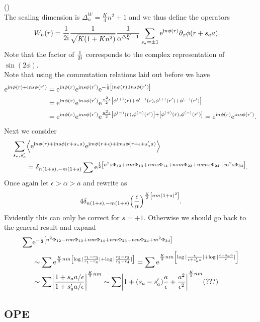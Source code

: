 \documentclass[english, parskip=full]{scrartcl}
\begin{document}
()\\
The scaling dimension is $\Delta^W_n = \frac{K}{4}n^2+1$ and we thus define the operators
\begin{align}
W_n(r) &= \frac{1}{2\i} \frac{1}{\sqrt{K \kla*{1 + Kn^2}}} \frac{1}{\alpha^{\Delta^W_n-1}} \sum_{s_a=\pm 1} \powe{\i n\phi(r)} \partial_x\phi(r+s_aa).
\end{align}
Note that the factor of $\frac{1}{2\i}$ corresponds to the complex representation of $\sin(2\phi)$.\\
Note that using the commutation relations laid out before we have
\begin{align}
\powe{\i n\phi(r) + \i ns\phi(r')} &= \powe{\i n\phi(r)}\powe{\i ns\phi(r')} \powe{-\frac{1}{2} \klb*{\i n\phi(r), \i ns\phi(r')}} \\
&= \powe{\i n\phi(r)}\powe{\i ns\phi(r')} \powe{\frac{n^2s}{2} \klb*{\phi^{(+)}(r) + \phi^{(-)}(r), \phi^{(+)}(r') + \phi^{(-)}(r')}}\\
&= \powe{\i n\phi(r)}\powe{\i ns\phi(r')} \powe{\frac{n^2s}{2} \klb*{\phi^{(-)}(r), \phi^{(+)}(r')} + \klb*{\phi^{(+)}(r), \phi^{(-)}(r')}} = \powe{\i n\phi(r)}\powe{\i ns\phi(r')}.
\end{align}
Next we consider 
\begin{align}
\sum_{s_a,s_a'}& \bra*{\powe{\i n\phi(r) + \i n s\phi(r+s_aa)}\powe{\i m\phi(r+\epsilon) + \i m s \phi(r+\epsilon+s_a'a)}}\\
&= \delta_{n(1+s),-m(1+s)} \sum \powe{\frac{1}{2} \klb*{n^2s\Phi_{12} + nm\Phi_{13} + nms \Phi_{14} + nsm\Phi_{23} + nsms\Phi_{24} + m^2s\Phi_{34}}}.
\end{align}
Once again let $\epsilon>\alpha>a$ and rewrite as
\begin{align}
4\delta_{n(1+s),-m(1+s)} \kla*{\frac{\epsilon}{\alpha}}^{\frac{K}{2}\klb*{nm(1+s)^2}}.
\end{align}
Evidently this can only be correct for $s=+1$.
Otherwise we should go back to the general result and expand
\begin{align}
\sum &\powe{-\frac{1}{2} \klb*{n^2\Phi_{12} - nm\Phi_{13} + nm \Phi_{14} + nm\Phi_{23} - nm\Phi_{24} + m^2\Phi_{34}}}\\
&\sim \sum \powe{\frac{K}{2}nm \klb*{\log|\frac{r_1-r_3}{r_1-r_4}| + \log|\frac{r_2-r_3}{r_2-r_4}|}} = \sum \powe{\frac{K}{2}nm \klb*{\log|\frac{\epsilon}{\epsilon + s_a'a}| + \log|\frac{\epsilon + s_aa}{\epsilon}|}}\\
&\sim \sum \abs*{\frac{1 + s_aa/\epsilon}{1 + s_a'a/\epsilon}}^{\frac{K}{2}nm} \sim \sum \abs*{ 1 + (s_a - s_a') \frac{a}{\epsilon} + \frac{a^2}{\epsilon^2} }^{\frac{K}{2}nm} (???)
\end{align}
\subsection{OPE}
\end{document}
